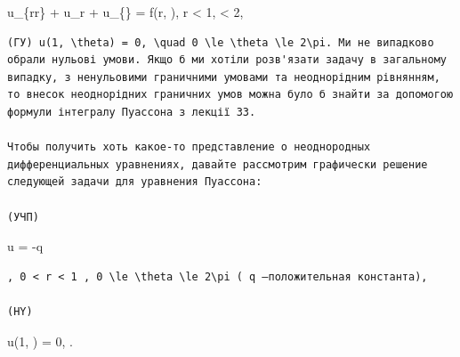 \documentclass[
  ukrainian,
]{article}
\begin{document}
u\_\{rr\} +  u\_r +  u\_\{\theta\theta\} = f(r,
\theta),  \le r \textless{} 1,  \le \theta \textless{}
2\pi,

\begin{verbatim}
(ГУ) u(1, \theta) = 0, \quad 0 \le \theta \le 2\pi. Ми не випадково обрали нульові умови. Якщо б ми хотіли розв'язати задачу в загальному випадку, з ненульовими граничними умовами та неоднорідним рівнянням, то внесок неоднорідних граничних умов можна було б знайти за допомогою формули інтегралу Пуассона з лекції 33.

Чтобы получить хоть какое-то представление о неоднородных дифференциальных уравнениях, давайте рассмотрим графически решение следующей задачи для уравнения Пуассона:

(УЧП)
\end{verbatim}

\Delta u = -q

\begin{verbatim}
, 0 < r < 1 , 0 \le \theta \le 2\pi ( q —положительная константа),

(HY)
\end{verbatim}

u(1, \theta) = 0,  \le \theta {}\pi.
\end{document}
